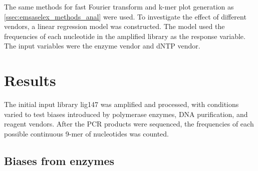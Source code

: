 \documentclass[parskip=full, numbers=noenddot]{scrreprt}
\begin{document}
The same methods for fast Fourier transform and k-mer plot generation as \ref{ssec:emsaselex_methods_anal} were used.
To investigate the effect of different vendors, a linear regression model was constructed.  The model used the frequencies of each nucleotide in the amplified library as the response variable.  The input variables were the enzyme vendor and dNTP vendor.

\section{Results}
\label{sec:pcrbias_results}

The initial input library lig147 was amplified and processed, with conditions varied to test biases introduced by polymerase enzymes, DNA purification, and reagent vendors.  After the PCR products were sequenced, the frequencies of each possible continuous 9-mer of nucleotides was counted.


\subsection{Biases from enzymes}
\label{ssec:pcrbias_result_enz}
\end{document}

